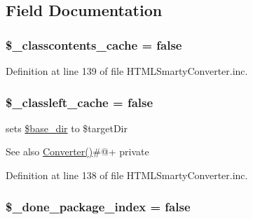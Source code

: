 \subsection{\-Field \-Documentation}
\hypertarget{class_h_t_m_l_smarty_converter_a27d1840f51b8f5f3b2771616155dcb8f}{
\subsubsection[{\$\-\_\-classcontents\-\_\-cache}]{\setlength{\rightskip}{0pt plus 5cm}\$\-\_\-classcontents\-\_\-cache = false}}\label{class_h_t_m_l_smarty_converter_a27d1840f51b8f5f3b2771616155dcb8f}


\-Definition at line 139 of file \-H\-T\-M\-L\-Smarty\-Converter.\-inc.

\hypertarget{class_h_t_m_l_smarty_converter_ae2deccd53952185054a55b156ea5acaf}{
\subsubsection[{\$\-\_\-classleft\-\_\-cache}]{\setlength{\rightskip}{0pt plus 5cm}\$\-\_\-classleft\-\_\-cache = false}}\label{class_h_t_m_l_smarty_converter_ae2deccd53952185054a55b156ea5acaf}
sets \hyperlink{class_h_t_m_l_smarty_converter_aa36f57c62963507498e1181f9a75bbb9}{\$base\-\_\-dir} to \$target\-Dir \begin{DoxySeeAlso}{\-See also}
\hyperlink{class_converter_a86b46c9ea23d7b44c9628a37bec7e7db}{\-Converter()}\#@+  private 
\end{DoxySeeAlso}


\-Definition at line 138 of file \-H\-T\-M\-L\-Smarty\-Converter.\-inc.

\hypertarget{class_h_t_m_l_smarty_converter_aa5add636e1066e14945f623e8623bc03}{
\subsubsection[{\$\-\_\-done\-\_\-package\-\_\-index}]{\setlength{\rightskip}{0pt plus 5cm}\$\-\_\-done\-\_\-package\-\_\-index = false}}\label{class_h_t_m_l_smarty_converter_aa5add636e1066e14945f623e8623bc03}


